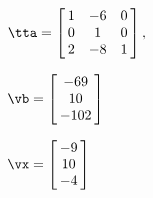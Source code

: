 {$\tta = \left[\hskip -3pt \begin{array}{ccc} 1&-6&0\\  0&1&0
\\  2&-8&1\end{array}\hskip -3pt \right] ,$

$\vb = \left[\hskip -3pt \begin{array}{c} -69\\  10
\\  -102\end{array}\hskip -3pt \right]$ 
}
{$\vx = \left[\hskip -3pt \begin{array}{c} -9\\  10\\  
-4\end{array}\hskip -3pt \right]$}
 
